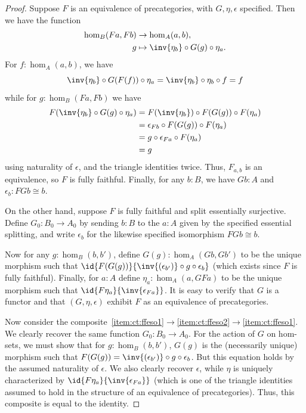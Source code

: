 \begin{proof}
  Suppose $F$ is an equivalence of precategories, with $G,\eta,\epsilon$ specified.
  Then we have the function
  \begin{align*}
      \hom_B(Fa,Fb) &\to \hom_A(a,b),\\
      g &\mapsto \inv{\eta_b}\circ G(g)\circ \eta_a.
  \end{align*}
  For $f:\hom_A(a,b)$, we have
  \[ \inv{\eta_{b}}\circ G(F(f))\circ \eta_{a}  =
  \inv{\eta_{b}} \circ \eta_{b} \circ f=
  f
  \]
  while for $g:\hom_B(Fa,Fb)$ we have
  \begin{align*}
    F(\inv{\eta_b} \circ G(g)\circ\eta_a)
    &= F(\inv{\eta_b})\circ F(G(g))\circ F(\eta_a)\\
    &= \epsilon_{Fb}\circ F(G(g))\circ F(\eta_a)\\
    &= g\circ\epsilon_{Fa}\circ F(\eta_a)\\
    &= g
  \end{align*}
  using naturality of $\epsilon$, and the triangle identities twice.
  Thus, $F_{a,b}$ is an equivalence, so $F$ is fully faithful.
  Finally, for any $b:B$, we have $Gb:A$ and $\epsilon_b:FGb\cong b$.

  On the other hand, suppose $F$ is fully faithful and split essentially surjective.
  Define $G_0:B_0\to A_0$ by sending $b:B$ to the $a:A$ given by the specified essential splitting, and write $\epsilon_b$ for the likewise specified isomorphism $FGb\cong b$.

  Now for any $g:\hom_B(b,b')$, define $G(g):\hom_A(Gb,Gb')$ to be the unique morphism such that $\id{F(G(g))}{\inv{(\epsilon_{b'})}\circ g \circ \epsilon_b }$ (which exists since $F$ is fully faithful).
  Finally, for $a:A$ define $\eta_a:\hom_A(a,GFa)$ to be the unique morphism such that $\id{F\eta_a}{\inv{\epsilon_{Fa}}}$.
  It is easy to verify that $G$ is a functor and that $(G,\eta,\epsilon)$ exhibit $F$ as an equivalence of precategories.

  Now consider the composite~\ref{item:ct:ffeso1}$\to$\ref{item:ct:ffeso2}$\to$\ref{item:ct:ffeso1}.
  We clearly recover the same function $G_0:B_0 \to A_0$.
  For the action of $G$ on hom-sets, we must show that for $g:\hom_B(b,b')$, $G(g)$ is the (necessarily unique) morphism such that $F(G(g)) = \inv{(\epsilon_{b'})}\circ g \circ \epsilon_b$.
  But this equation holds by the assumed naturality of $\epsilon$.
  We also clearly recover $\epsilon$, while $\eta$ is uniquely characterized by $\id{F\eta_a}{\inv{\epsilon_{Fa}}}$ (which is one of the triangle identities assumed to hold in the structure of an equivalence of precategories).
  Thus, this composite is equal to the identity.


\end{proof}
